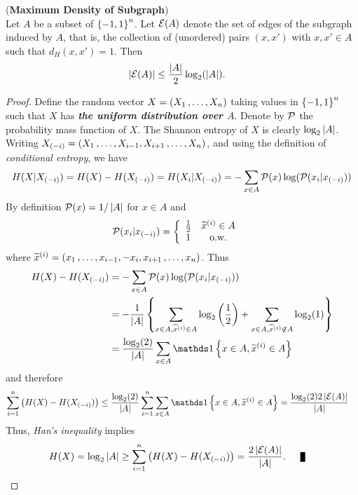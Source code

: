 \documentclass[11pt]{article}
\begin{document}
\begin{itemize}
\begin{theorem} (\textbf{Maximum Density of Subgraph}) \citep{boucheron2013concentration}\\
Let $A$ be a subset of $\left\{-1, 1\right\}^n$. Let ${\mathcal E}(A)$ denote the set of edges of the subgraph induced by $A$, that is, the collection of (unordered) pairs $(x, x')$ with $x, x' \in A$ such that $d_H(x, x') = 1$. Then
\begin{align}
\left\lvert {\mathcal E}(A) \right\rvert &\le \frac{\left\lvert A \right\rvert}{2} \log_2(\left\lvert A \right\rvert). \label{ineqn: max_density_subgraph}
\end{align}
\end{theorem}
\begin{proof}
Define the random vector $X = (X_1 \,{,}\ldots{,}\, X_n)$ taking values in $\left\{-1, 1\right\}^n$  such that $X$ has \emph{\textbf{the uniform distribution over $A$}}. Denote by ${\mathcal P}$ the probability mass function of $X$. The Shannon entropy of $X$ is clearly $\log_{2}\left\lvert A \right\rvert$.  Writing $X_{(-i)} = (X_1 \,{,}\ldots{,}\, X_{i-1}, X_{i+1} \,{,}\ldots{,}\, X_{n})$, and using the definition of \emph{conditional entropy}, we have
\begin{align*}
H(X | X_{(-i)}) = H(X) - H(X_{(-i)}) = H(X_i | X_{(-i)}) = - \sum_{x\in A} {\mathcal P}(x) \log({\mathcal P}(x_i | x_{(-i)})) 
\end{align*} By definition ${\mathcal P}(x) =1/\left\lvert A \right\rvert$ for $x \in A$ and 
\begin{align*}
{\mathcal P}(x_i | x_{(-i)}) &= \left\{ \begin{array}{cc}
\frac{1}{2} & \widetilde{x}^{(i)}  \in A \\
1 & \text{o.w.}
\end{array}
\right.
\end{align*} where $\widetilde{x}^{(i)} = (x_1 \,{,}\ldots{,}\, x_{i-1}, -x_i,  x_{i+1} \,{,}\ldots{,}\, x_{n})$. Thus
\begin{align*}
H(X) - H(X_{(-i)}) &=  - \sum_{x\in A} \cP(x) \log(\cP(x_i | x_{(-i)})) \\
 &= - \frac{1}{\abs{A}}\set{ \sum_{x\in A, \widetilde{x}^{(i)}  \in A} \log_2\paren{\frac{1}{2}} + \sum_{x\in A, \widetilde{x}^{(i)}  \not\in A} \log_2(1)}\\
 &= \frac{\log_2(2)}{\abs{A}} \sum_{x \in A}\ind{x\in A, \widetilde{x}^{(i)}  \in A}
\end{align*} and therefore
\begin{align*}
\sum_{i=1}^{n}\paren{H(X) - H(X_{(-i)})} &\le \frac{\log_2(2)}{\abs{A}} \sum_{i=1}^{n}\sum_{x \in A}\ind{x\in A, \widetilde{x}^{(i)}  \in A} = \frac{\log_2(2) 2 \abs{\cE(A)}}{\abs{A}}
\end{align*} Thus, \emph{Han's inequality} implies
\begin{align*}
H(X) = \log_{2}\abs{A} &\ge \sum_{i=1}^{n}\paren{H(X) - H(X_{(-i)})} =  \frac{2 \abs{\cE(A)}}{\abs{A}}. \qed
\end{align*}
\end{proof}


\end{itemize}
\end{document}
